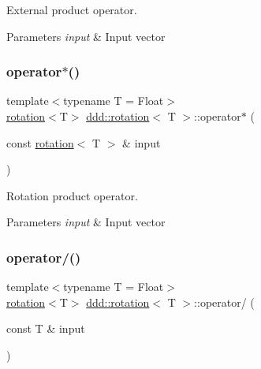 External product operator. 


\begin{DoxyParams}{Parameters}
{\em input} & Input vector \\
\hline
\end{DoxyParams}
\mbox{\label{classddd_1_1rotation_af4bae9f617bb9760fc44d5520098e2eb}} 
\subsubsection{\texorpdfstring{operator$\ast$()}{operator*()}\hspace{0.1cm}{\footnotesize\ttfamily [4/4]}}
{\footnotesize\ttfamily template$<$typename T  = Float$>$ \\
\hyperlink{classddd_1_1rotation}{rotation}$<$T$>$ \hyperlink{classddd_1_1rotation}{ddd\+::rotation}$<$ T $>$\+::operator$\ast$ (\begin{DoxyParamCaption}\item[{const \hyperlink{classddd_1_1rotation}{rotation}$<$ T $>$ \&}]{input }\end{DoxyParamCaption})\hspace{0.3cm}{\ttfamily [inline]}}



Rotation product operator. 


\begin{DoxyParams}{Parameters}
{\em input} & Input vector \\
\hline
\end{DoxyParams}
\mbox{\label{classddd_1_1rotation_ac95799a9a25f9653d39ab3339b8085b7}} 
\subsubsection{\texorpdfstring{operator/()}{operator/()}}
{\footnotesize\ttfamily template$<$typename T  = Float$>$ \\
\hyperlink{classddd_1_1rotation}{rotation}$<$T$>$ \hyperlink{classddd_1_1rotation}{ddd\+::rotation}$<$ T $>$\+::operator/ (\begin{DoxyParamCaption}\item[{const T \&}]{input }\end{DoxyParamCaption})\hspace{0.3cm}{\ttfamily [inline]}}



